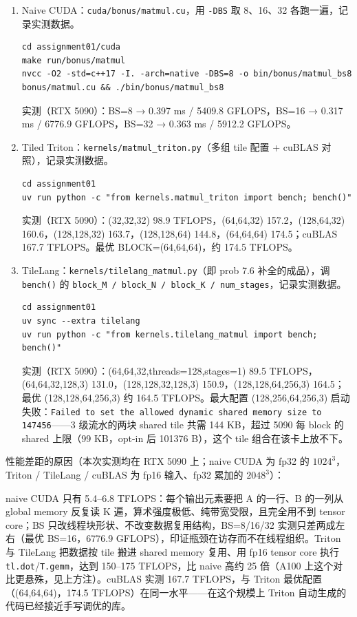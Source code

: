 \documentclass[11pt,a4paper,fontset=none]{ctexart}
\begin{document}
\begin{enumerate}[label=(\alph*)]
  \item Naive CUDA：\texttt{cuda/bonus/matmul.cu}，用 \texttt{-DBS} 取 8、16、32 各跑一遍，记录实测数据。
        \begin{lstlisting}
cd assignment01/cuda
make run/bonus/matmul
nvcc -O2 -std=c++17 -I. -arch=native -DBS=8 -o bin/bonus/matmul_bs8 bonus/matmul.cu && ./bin/bonus/matmul_bs8
\end{lstlisting}

        实测（RTX 5090）：BS=8 → 0.397 ms / 5409.8 GFLOPS，BS=16 → 0.317 ms / 6776.9 GFLOPS，BS=32 → 0.363 ms / 5912.2 GFLOPS。
  \item Tiled Triton：\texttt{kernels/matmul\_triton.py}（多组 tile 配置 + cuBLAS 对照），记录实测数据。
        \begin{lstlisting}
cd assignment01
uv run python -c "from kernels.matmul_triton import bench; bench()"
\end{lstlisting}

        实测（RTX 5090）：(32,32,32) 98.9 TFLOPS，(64,64,32) 157.2，(128,64,32) 160.6，(128,128,32) 163.7，(128,128,64) 144.8，(64,64,64) 174.5；cuBLAS 167.7 TFLOPS。最优 BLOCK=(64,64,64)，约 174.5 TFLOPS。
  \item TileLang：\texttt{kernels/tilelang\_matmul.py}（即 prob 7.6 补全的成品），调 \texttt{bench()} 的 \texttt{block\_M / block\_N / block\_K / num\_stages}，记录实测数据。
        \begin{lstlisting}
cd assignment01
uv sync --extra tilelang
uv run python -c "from kernels.tilelang_matmul import bench; bench()"
\end{lstlisting}

        实测（RTX 5090）：(64,64,32,threads=128,stages=1) 89.5 TFLOPS，(64,64,32,128,3) 131.0，(128,128,32,128,3) 150.9，(128,128,64,256,3) 164.5；最优 (128,128,64,256,3) 约 164.5 TFLOPS。最大配置 (128,256,64,256,3) 启动失败：\texttt{Failed to set the allowed dynamic shared memory size to 147456}——3 级流水的两块 shared tile 共需 144 KB，超过 5090 每 block 的 shared 上限（99 KB，opt-in 后 101376 B），这个 tile 组合在该卡上放不下。
\end{enumerate}

性能差距的原因（本次实测均在 RTX 5090 上；naive CUDA 为 fp32 的 $1024^3$，Triton / TileLang / cuBLAS 为 fp16 输入、fp32 累加的 $2048^3$）：

naive CUDA 只有 5.4--6.8 TFLOPS：每个输出元素要把 A 的一行、B 的一列从 global memory 反复读 K 遍，算术强度极低、纯带宽受限，且完全用不到 tensor core；BS 只改线程块形状、不改变数据复用结构，BS=8/16/32 实测只差两成左右（最优 BS=16，6776.9 GFLOPS），印证瓶颈在访存而不在线程组织。Triton 与 TileLang 把数据按 tile 搬进 shared memory 复用、用 fp16 tensor core 执行 \texttt{tl.dot}/\texttt{T.gemm}，达到 150--175 TFLOPS，比 naive 高约 25 倍（A100 上这个对比更悬殊，见上方注）。cuBLAS 实测 167.7 TFLOPS，与 Triton 最优配置（(64,64,64)，174.5 TFLOPS）在同一水平——在这个规模上 Triton 自动生成的代码已经接近手写调优的库。
\end{document}
